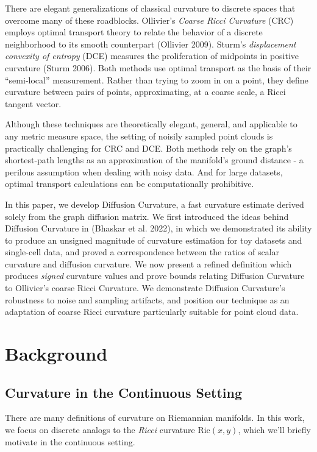 \documentclass[
  letterpaper,
  DIV=11,
  numbers=noendperiod]{scrartcl}
\theoremstyle{plain}
\theoremstyle{plain}
\theoremstyle{definition}
\theoremstyle{plain}
\theoremstyle{definition}
\theoremstyle{remark}
\begin{document}
There are elegant generalizations of classical curvature to discrete
spaces that overcome many of these roadblocks. Ollivier's \emph{Coarse
Ricci Curvature} (CRC) employs optimal transport theory to relate the
behavior of a discrete neighborhood to its smooth counterpart (Ollivier
2009). Sturm's \emph{displacement convexity of entropy} (DCE) measures
the proliferation of midpoints in positive curvature (Sturm 2006). Both
methods use optimal transport as the basis of their ``semi-local''
measurement. Rather than trying to zoom in on a point, they define
curvature between pairs of points, approximating, at a coarse scale, a
Ricci tangent vector.

Although these techniques are theoretically elegant, general, and
applicable to any metric measure space, the setting of noisily sampled
point clouds is practically challenging for CRC and DCE. Both methods
rely on the graph's shortest-path lengths as an approximation of the
manifold's ground distance - a perilous assumption when dealing with
noisy data. And for large datasets, optimal transport calculations can
be computationally prohibitive.

In this paper, we develop Diffusion Curvature, a fast curvature estimate
derived solely from the graph diffusion matrix. We first introduced the
ideas behind Diffusion Curvature in (Bhaskar et al. 2022), in which we
demonstrated its ability to produce an unsigned magnitude of curvature
estimation for toy datasets and single-cell data, and proved a
correspondence between the ratios of scalar curvature and diffusion
curvature. We now present a refined definition which produces
\emph{signed} curvature values and prove bounds relating Diffusion
Curvature to Ollivier's coarse Ricci Curvature. We demonstrate Diffusion
Curvature's robustness to noise and sampling artifacts, and position our
technique as an adaptation of coarse Ricci curvature particularly
suitable for point cloud data.

\section{Background}\label{background}

\subsection{Curvature in the Continuous
Setting}\label{curvature-in-the-continuous-setting}

There are many definitions of curvature on Riemannian manifolds. In this
work, we focus on discrete analogs to the \emph{Ricci} curvature
\(\text{Ric}(x,y)\), which we'll briefly motivate in the continuous
setting.
\end{document}
